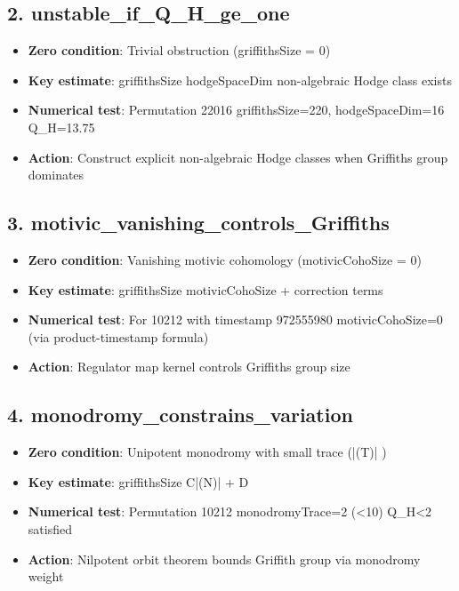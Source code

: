 \documentclass[11pt]{article}
\begin{document}
\subsection{2. unstable\_if\_Q\_H\_ge\_one}
\begin{itemize}
\item \textbf{Zero condition}: Trivial obstruction (griffithsSize = 0)
\item \textbf{Key estimate}: griffithsSize \geq hodgeSpaceDim \rightarrow non-algebraic Hodge class exists
\item \textbf{Numerical test}: Permutation 22016 \rightarrow griffithsSize=220, hodgeSpaceDim=16 \rightarrow Q\_H=13.75 
\item \textbf{Action}: Construct explicit non-algebraic Hodge classes when Griffiths group dominates
\end{itemize}

\subsection{3. motivic\_vanishing\_controls\_Griffiths}
\begin{itemize}
\item \textbf{Zero condition}: Vanishing motivic cohomology (motivicCohoSize = 0)
\item \textbf{Key estimate}: griffithsSize \leq motivicCohoSize + correction terms
\item \textbf{Numerical test}: For 10212 with timestamp 972555980 \rightarrow motivicCohoSize=0 (via product-timestamp formula)
\item \textbf{Action}: Regulator map kernel controls Griffiths group size
\end{itemize}

\subsection{4. monodromy\_constrains\_variation}
\begin{itemize}
\item \textbf{Zero condition}: Unipotent monodromy with small trace (|\log(T)| )
\item \textbf{Key estimate}: griffithsSize \leq C\cdot|(N)| + D
\item \textbf{Numerical test}: Permutation 10212 \rightarrow monodromyTrace=2 (<10) \rightarrow Q\_H<2 satisfied
\item \textbf{Action}: Nilpotent orbit theorem bounds Griffith group via monodromy weight
\end{itemize}
\end{document}
